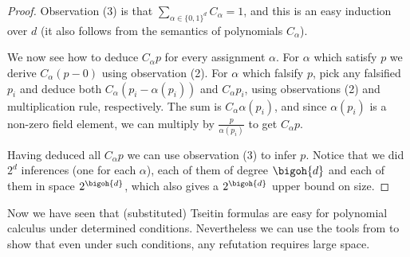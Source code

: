 \begin{proof}
Observation (3) is that $\sum_{\alpha\in\{0,1\}^{d}} C_{\alpha} = 1$,
and this is an easy induction over $d$ (it also follows from the
semantics of polynomials $C_\alpha$).

We now see how to deduce $C_{\alpha} p$ for every assignment $\alpha$.
%
For $\alpha$ which satisfy $p$ we derive $C_{\alpha}(p - 0)$ using observation (2).
%
For $\alpha$ which falsify $p$, pick any falsified $p_{i}$ and deduce
both $C_{\alpha} (p_{i}-\alpha(p_{i}))$ and $C_{\alpha}p_{i}$, using
observations (2) and multiplication rule, respectively. The sum is
$C_{\alpha}\alpha(p_{i})$, and since $\alpha(p_{i})$ is a non-zero
field element, we
can multiply by $\frac{p}{\alpha(p_{i})}$ to get $C_{\alpha}p$.
%

Having deduced all $C_{\alpha}p$ we can use observation (3) to infer $p$.
%
Notice that we did $2^{d}$ inferences (one for each $\alpha$), each of them of degree $\bigoh{d}$ and each of them in space $2^{\bigoh{d}}$, which also gives
%
a $2^{\bigoh{d}}$ upper bound %
on size.
\end{proof}

Now we have seen that (substituted) Tseitin formulas are easy for
polynomial calculus under determined conditions. Nevertheless we can
use the tools from  to show that even
under such conditions, any refutation requires large space.

